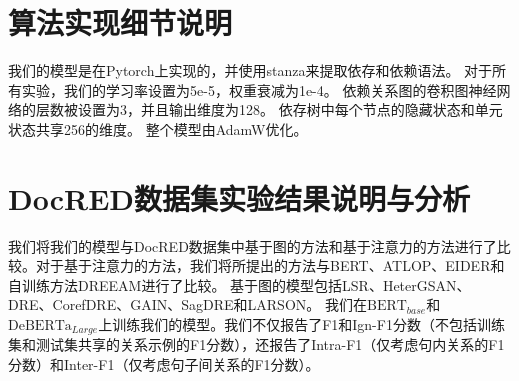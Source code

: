 \documentclass[bachelor]{thesis-uestc}
\begin{document}
\section{算法实现细节说明}\label{sec:implementation}

我们的模型是在Pytorch\cite{paszke2019pytorch}上实现的，并使用stanza\cite{qi2020stanza}来提取依存和依赖语法。
对于所有实验，我们的学习率设置为5e-5，权重衰减为1e-4。
依赖关系图的卷积图神经网络的层数被设置为3，并且输出维度为128。
依存树中每个节点的隐藏状态和单元状态共享256的维度。
整个模型由AdamW优化。

\section{DocRED数据集实验结果说明与分析}\label{sec:docred}

我们将我们的模型与DocRED数据集中基于图的方法和基于注意力的方法进行了比较。对于基于注意力的方法，我们将所提出的方法与BERT\cite{DOCRED}、ATLOP\cite{zhou2021document}、EIDER\cite{xie2022eider}和自训练方法DREEAM\cite{ma-etal-2023-DREEAM}进行了比较。
基于图的模型包括LSR\cite{nan-etal-2020-reasoning}、HeterGSAN\cite{zhang-etal-2020-document}、DRE\cite{xu-etal-2021-discriminative}、CorefDRE\cite{xue2022corefdre}、GAIN\cite{GAIN}、SagDRE\cite{SagDRE}和LARSON\cite{duan-etal-2022-just}。
我们在$\mathrm{BERT}_{base}$和$\mathrm{DeBERTa}_{Large}$上训练我们的模型。我们不仅报告了F1和Ign-F1分数（不包括训练集和测试集共享的关系示例的F1分数），还报告了Intra-F1（仅考虑句内关系的F1分数）和Inter-F1（仅考虑句子间关系的F1分数）。\par
\end{document}
